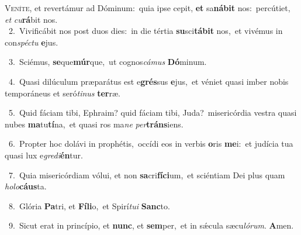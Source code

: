 \lettrine{\initial\textcolor{\initialcolor}{V}}{eníte,} et revertámur ad Dóminum:~\dagger quia ipse cepit, \textbf{et} sa\-\textbf{ná}\-\textbf{bit} nos:~\star percútiet, \textit{et} \textit{cu}\-\textbf{rá}bit nos.\\
{\numbfont\textcolor{\numbcolor}{~2.}}~Vivificábit nos post duos dies:~\dagger in die tértia \textbf{su}\-sci\-\textbf{tá}\-\textbf{bit} nos,~\star et vivémus in con\-\textit{spéc}\-\textit{tu} \textbf{e}\-jus.\par
{\numbfont\textcolor{\numbcolor}{~3.}}~Sciémus, \textbf{se}\-que\-\textbf{múr}\-que,~\star ut cognos\-\textit{cá}\-\textit{mus} \textbf{Dó}\-minum.\par
{\numbfont\textcolor{\numbcolor}{~4.}}~Quasi dilúculum præparátus est e\-\textbf{grés}\-sus \textbf{e}\-jus,~\star et véniet quasi imber nobis temporáneus et seró\-\textit{ti}\-\textit{nus} \textbf{ter}\-ræ.\par
{\numbfont\textcolor{\numbcolor}{~5.}}~Quid fáciam tibi, Ephraim? quid fáciam tibi, Juda?~\dagger misericórdia vestra quasi nubes \textbf{ma}\-tu\-\textbf{tí}\-na,~\star et quasi ros ma\textit{ne} \textit{per}\-\textbf{tráns}iens.\par
{\numbfont\textcolor{\numbcolor}{~6.}}~Propter hoc dolávi in prophétis,~\dagger occídi eos in verbis \textbf{o}\-ris \textbf{me}\-i:~\star et judícia tua quasi lux e\-\textit{gre}\-\textit{di}\textbf{én}tur.\par
{\numbfont\textcolor{\numbcolor}{~7.}}~Quia misericórdiam vólui, et non \textbf{sa}\-cri\-\textbf{fí}\-\textbf{ci}um,~\star et sciéntiam Dei plus quam \textit{ho}\-\textit{lo}\textbf{cáus}ta.\par
{\numbfont\textcolor{\numbcolor}{~8.}}~Glória \textbf{Pa}\-tri, et \textbf{Fí}\-\textbf{li}o,~\star et Spirí\-\textit{tu}\-\textit{i} \textbf{Sanc}\-to.\par
{\numbfont\textcolor{\numbcolor}{~9.}}~Sicut erat in princípio, et \textbf{nunc}\-, et \textbf{sem}\-per,~\star et in sǽcula sæcu\-\textit{ló}\-\textit{rum}. \textbf{A}\-men.\par
